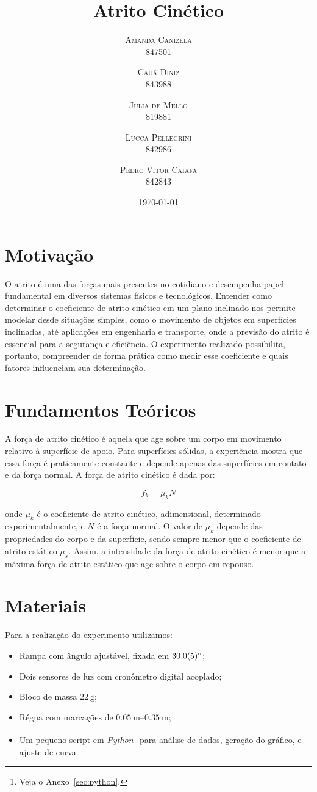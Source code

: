 \documentclass[10pt,oneside,twocolumn,a4paper]{article}
\title{Atrito Cinético}
\author{
	\textsc{Amanda Canizela} \\[1ex]
	\normalsize{847501}
	\and \textsc{Cauã Diniz} \\[1ex]
	\normalsize{843988}
	\and \textsc{Júlia de Mello} \\[1ex]
	\normalsize{819881}
	\and \textsc{Lucca Pellegrini} \\[1ex]
	\normalsize{842986}
	\and \textsc{Pedro Vitor Caiafa} \\[1ex]
	\normalsize{842843}
}
\date{\today}
\begin{document}
\maketitle

\section{Motivação}

O atrito é uma das forças mais presentes no cotidiano e desempenha papel
fundamental em diversos sistemas físicos e tecnológicos. Entender como
determinar o coeficiente de atrito cinético em um plano inclinado nos permite
modelar desde situações simples, como o movimento de objetos em superfícies
inclinadas, até aplicações em engenharia e transporte, onde a previsão do
atrito é essencial para a segurança e eficiência. O experimento realizado
possibilita, portanto, compreender de forma prática como medir esse coeficiente
e quais fatores influenciam sua determinação.

\section{Fundamentos Teóricos}

A força de atrito cinético é aquela que age sobre um corpo em movimento
relativo à superfície de apoio. Para superfícies sólidas, a experiência mostra
que essa força é praticamente constante e depende apenas das superfícies em
contato e da força normal. A força de atrito cinético é dada por:

\begin{equation*}
f_k = \mu_k N
\end{equation*}

onde $\mu_k$ é o coeficiente de atrito cinético, adimensional, determinado
experimentalmente, e $N$ é a força normal. O valor de $\mu_k$ depende das
propriedades do corpo e da superfície, sendo sempre menor que o coeficiente de
atrito estático $\mu_s$. Assim, a intensidade da força de atrito cinético é
menor que a máxima força de atrito estático que age sobre o corpo em repouso.

\section{Materiais}

Para a realização do experimento utilizamos:

\begin{itemize}
    \item Rampa com ângulo ajustável, fixada em $\SI{30 \pm 0.5}{\degree}$;
    \item Dois sensores de luz com cronômetro digital acoplado;
    \item Bloco de massa $\SI{22}{\gram}$;
	\item Régua com marcações de $\SIrange{0.05}{0.35}{\metre};$
	\item Um pequeno script em \textit{Python}\footnote{Veja o
		Anexo~\ref{sec:python}.} para análise de dados, geração do gráfico, e
		ajuste de curva.
\end{itemize}
\end{document}
